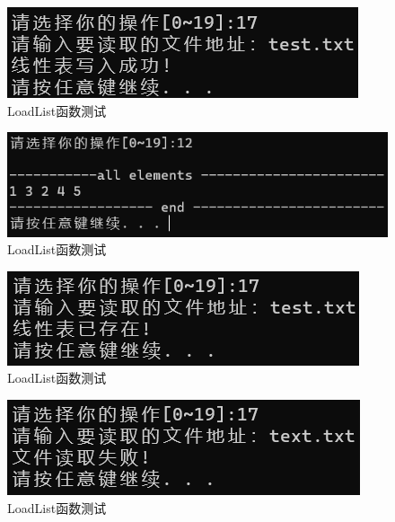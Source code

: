 \documentclass[supercite]{Experimental_Report}
\theoremstyle{definition}
\begin{document}
\begin{enumerate}
	
	\begin{figure}[H] %
		\begin{center}
			\includegraphics[width=0.5\linewidth]{images/linklist/17-1.png}
			\caption{ LoadList函数测试}
			\label{fig1-15-1}
		\end{center}
	\end{figure}
	\begin{figure}[H] %
		\begin{center}
			\includegraphics[width=0.5\linewidth]{images/linklist/12-1.png}
			\caption{ LoadList函数测试}
			\label{fig1-15-2}
		\end{center}
	\end{figure}
	\begin{figure}[H] %
		\begin{center}
			\includegraphics[width=0.5\linewidth]{images/linklist/17-2.png}
			\caption{ LoadList函数测试}
			\label{fig1-15-3}
		\end{center}
	\end{figure}
	\begin{figure}[H] %
		\begin{center}
			\includegraphics[width=0.5\linewidth]{images/linklist/17-3.png}
			\caption{ LoadList函数测试}
			\label{fig1-15-4}
		\end{center}
	\end{figure}

\end{enumerate}
\end{document}
